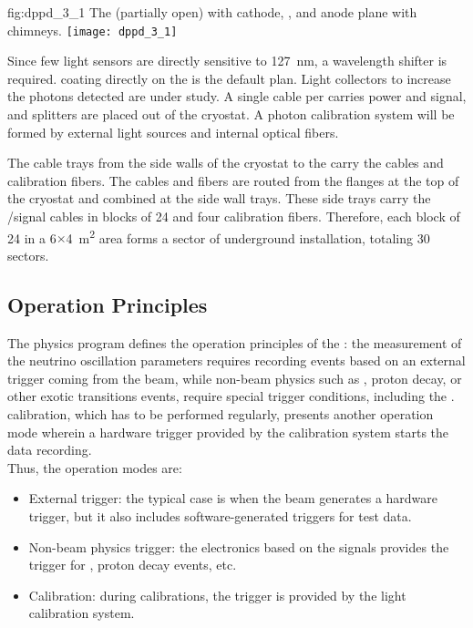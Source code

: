 \begin{dunefigure}{fig:dppd_3_1}
{The  (partially open) with cathode, ,  and anode plane with chimneys.}
\texttt{[image: dppd\_3\_1]}
\end{dunefigure}

Since few light sensors are directly sensitive to \SI{127}{nm}, a wavelength shifter is required.  coating directly on the  is the default plan. Light collectors to increase the photons detected are under study. A single cable per  carries power and signal, and splitters are placed out of the cryostat. A photon calibration system will be formed by external light sources and internal optical fibers.  

The cable trays from the side walls of the cryostat to the  carry the cables and calibration fibers. The cables and fibers are routed from the \fdth flanges at the top of the cryostat and  combined at the side wall trays. These side trays carry the /signal cables in blocks of \num{24}  and four calibration fibers. Therefore, each block of \num{24}  in a \num{6}$\times$\SI{4}{m^2} area forms a sector of underground installation, totaling \num{30} sectors.

\subsection{Operation Principles}
\label{sec:fddp-pd-1.5}

The physics program defines the operation principles of the : the measurement of the neutrino oscillation parameters requires recording events based on an external trigger coming from the beam, while non-beam physics such as  , proton decay, or other exotic transitions events, require special trigger conditions, including the .  calibration, which has to be performed regularly, presents another operation mode wherein  a hardware trigger provided by the calibration system starts the data recording. \\    

Thus, the operation modes are:
\begin{itemize}
\item External trigger: %
the typical case is when the beam generates a hardware trigger,  %
but it also includes software-generated triggers for test data.
\item Non-beam physics trigger: the electronics based on the  signals provides the trigger for  , proton decay events, etc.
\item Calibration: during  calibrations, the trigger is provided by the light calibration system.
\end{itemize}

